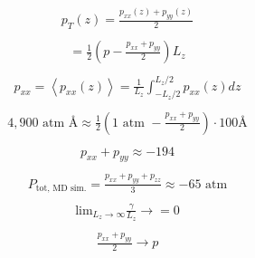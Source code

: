 \documentclass[12pt,reqno]{amsart}
\numberwithin{equation}{section}
\begin{document}
\begin{enumerate}
\begin{align}
\begin{split}
p_T(z) = \frac{p_{xx}(z) + p_{yy}(z)}{2}
\end{split}
\end{align} 
\begin{align}
\begin{split}
= \frac{1}{2}\left(p - \frac{p_{xx} + p_{yy}}{2}\right)L_z
\end{split}
\end{align} 
\begin{align}
\begin{split}
p_{xx} = \left<p_{xx}(z)\right> = \frac{1}{L_z}\int_{-L_z/2}^{L_z/2}p_{xx}(z)dz
\end{split}
\end{align} 
\begin{align}
\begin{split}
4,900 \text{ atm } \text{\AA} \approx \frac{1}{2}(1 \text{ atm } - \frac{p_{xx} + p_{yy}}{2})\cdot 100 \text{\AA}
\end{split}
\end{align} 
\begin{align}
\begin{split}
p_{xx} + p_{yy} \approx -194
\end{split}
\end{align} 
\begin{align}
\begin{split}
P_{\text{tot, MD sim.}} = \frac{p_{xx} + p_{yy} + p_{zz}}{3} \approx -65\text{ atm}
\end{split}
\end{align}
\begin{align}
\begin{split}
\text{lim}_{L_z\rightarrow\infty}\frac{\gamma}{L_z}\rightarrow = 0
\end{split}
\end{align} 
\begin{align}
\begin{split}
\frac{p_{xx} + p_{yy}}{2} \rightarrow p
\end{split}
\end{align} 
\end{enumerate}
\end{document}
